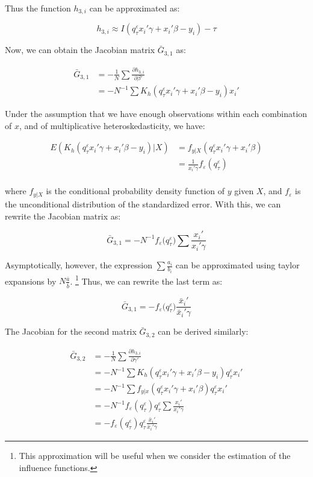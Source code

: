 \documentclass[
  authoryear,
  review,
  1p]{elsarticle}
\begin{document}
Thus the function \(h_{3,i}\) can be approximated as:

\[h_{3,i} \approx I\left( q^\varepsilon_\tau x_i'\gamma +x_i'\beta - y_i  \right) - \tau\]

Now, we can obtain the Jacobian matrix \(\bar G_{3,1}\) as:

\[\begin{aligned}
\bar G_{3,1} &= -\frac{1}{N} \sum \frac{\partial h_{3,i}}{\partial \beta'} \\
             &= -N^{-1} \sum K_h(q^\varepsilon_\tau x_i'\gamma +x_i'\beta - y_i ) x_i'
\end{aligned}
\]

Under the assumption that we have enough observations within each
combination of \(x\), and of multiplicative heteroskedasticity, we have:

\[\begin{aligned}
E(K_h(q^\varepsilon_\tau x_i'\gamma +x_i'\beta - y_i )|X) &= f_{y|X}(q^\varepsilon_\tau x_i'\gamma +x_i'\beta) \\
&=\frac{1}{x_i'\gamma} f_{\varepsilon}(q^\varepsilon_\tau) \\
\end{aligned}
\]

where \(f_{y|X}\) is the conditional probability density function of
\(y\) given \(X\), and \(f_\varepsilon\) is the unconditional
distribution of the standardized error. With this, we can rewrite the
Jacobian matrix as:

\[\bar G_{3,1} = -N^{-1} f_{\varepsilon}\big(q^\varepsilon_\tau\big) \sum  \frac{x_i'}{x_i'\gamma} 
\]

Asymptotically, however, the expression \(\sum\frac{a_i}{b_i}\) can be
approximated using taylor expansions by \(N\frac{\bar a}{\bar b}\).
\footnote{This approximation will be useful when we consider the
  estimation of the influence functions.} Thus, we can rewrite the last
term as:

\[\bar G_{3,1} = - f_{\varepsilon}\big(q^\varepsilon_\tau\big) \frac{\bar x_i'}{\bar x_i'\gamma} 
\]

The Jacobian for the second matrix \(\bar G_{3,2}\) can be derived
similarly:

\[\begin{aligned}
\bar G_{3,2} &= -\frac{1}{N} \sum \frac{\partial h_{3,i}}{\partial \gamma'} \\
             &= -N^{-1} \sum K_h(q^\varepsilon_\tau x_i'\gamma +x_i'\beta - y_i ) q^\varepsilon_\tau x_i' \\
             &=-N^{-1} \sum f_{y|x}(q^\varepsilon_\tau x_i'\gamma +x_i'\beta ) q^\varepsilon_\tau x_i' \\
             &=-N^{-1} f_{\varepsilon}(q^\varepsilon_\tau) q^\varepsilon_\tau \sum \frac{x_i'}{x_i'\gamma} \\
             &=- f_{\varepsilon}(q^\varepsilon_\tau) q^\varepsilon_\tau \frac{\bar x_i'}{\bar x_i'\gamma}
\end{aligned}
\]
\end{document}
